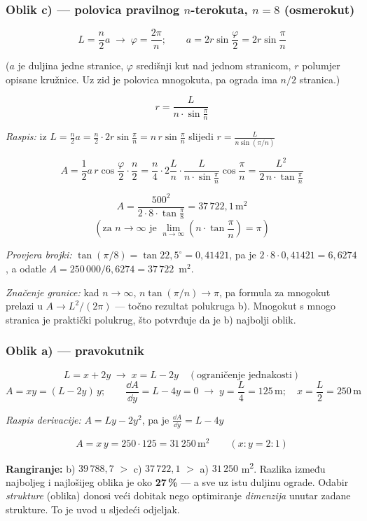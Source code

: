 \subsubsection*{Oblik c) --- polovica pravilnog $n$-terokuta, $n = 8$ (osmerokut)}
\[
L = \frac{n}{2}a \;\to\; \varphi = \frac{2\pi}{n}; \qquad
a = 2r\sin\frac{\varphi}{2} = 2r\sin\frac{\pi}{n}
\]

($a$ je duljina jedne stranice, $\varphi$ središnji kut nad jednom stranicom,
$r$ polumjer opisane kružnice. Uz zid je polovica mnogokuta, pa ograda ima $n/2$
stranica.)

\[
r = \frac{L}{n \cdot \sin\frac{\pi}{n}}
\]

\emph{Raspis:} iz $L = \tfrac{n}{2}a = \tfrac{n}{2}\cdot 2r\sin\tfrac{\pi}{n}
= n\,r\sin\tfrac{\pi}{n}$ slijedi $r = \tfrac{L}{n\sin(\pi/n)}$ \checkmark

\[
A = \frac{1}{2}a\,r\cos\frac{\varphi}{2}\cdot\frac{n}{2}
= \frac{n}{4}\cdot 2\frac{L}{n}\cdot\frac{L}{n\cdot\sin\frac{\pi}{n}}
  \cos\frac{\pi}{n}
= \frac{L^2}{2\,n \cdot \tan\frac{\pi}{n}}
\]

\[
A = \frac{500^2}{2 \cdot 8 \cdot \tan\frac{\pi}{8}} = 37\,722{,}1\,\text{m}^2
\]
\[
\left(\text{za } n \to \infty \text{ je }
\lim_{n\to\infty}\left(n\cdot\tan\frac{\pi}{n}\right) = \pi\right)
\]

\emph{Provjera brojki:} $\tan(\pi/8) = \tan 22{,}5^\circ = 0{,}41421$, pa je
$2 \cdot 8 \cdot 0{,}41421 = 6{,}6274$, a odatle
$A = 250\,000/6{,}6274 = 37\,722$~m$^2$. \checkmark

\emph{Značenje granice:} kad $n \to \infty$, $n\tan(\pi/n) \to \pi$, pa formula
za mnogokut prelazi u $A \to L^2/(2\pi)$ --- točno rezultat polukruga b).
Mnogokut s mnogo stranica je praktički polukrug, što potvrđuje da je b)
najbolji oblik.

\subsubsection*{Oblik a) --- pravokutnik}
\[
L = x + 2y \;\to\; x = L - 2y \quad (\text{ograničenje jednakosti})
\]
\[
A = xy = (L - 2y)\,y; \qquad
\frac{\dd A}{\dd y} = L - 4y = 0 \;\to\;
y = \frac{L}{4} = 125\,\text{m}; \quad x = \frac{L}{2} = 250\,\text{m}
\]

\emph{Raspis derivacije:} $A = Ly - 2y^2$, pa je
$\tfrac{\dd A}{\dd y} = L - 4y$ \checkmark

\[
A = x\,y = 250 \cdot 125 = 31\,250\,\text{m}^2 \qquad (x : y = 2 : 1)
\]

\textbf{Rangiranje:} b) $39\,788{,}7$ $>$ c) $37\,722{,}1$ $>$ a) $31\,250$
m\textsuperscript{2}. Razlika između najboljeg i najlošijeg oblika je oko
\textbf{27\,\%} --- a sve uz istu duljinu ograde. Odabir \emph{strukture}
(oblika) donosi veći dobitak nego optimiranje \emph{dimenzija} unutar zadane
strukture. To je uvod u sljedeći odjeljak.

